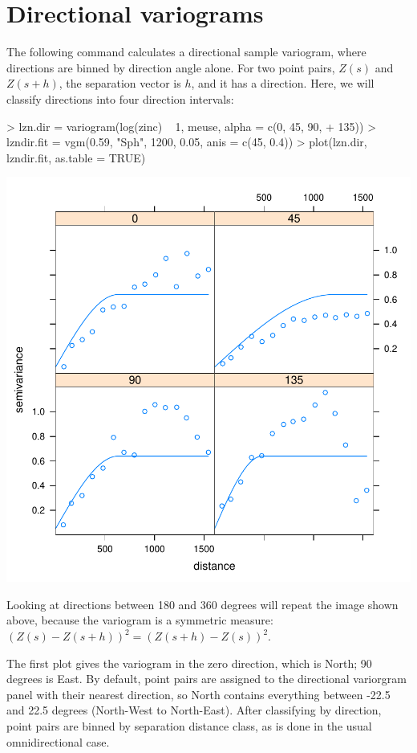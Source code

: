\documentclass[a4paper]{article}
\begin{document}
\section{Directional variograms}
The following command calculates a directional sample variogram, where
directions are binned by direction angle alone. For two point pairs,
$Z(s)$ and $Z(s+h)$, the separation vector is $h$, and it has a direction.
Here, we will classify directions into four direction intervals:

\begin{Schunk}
\begin{Sinput}
> lzn.dir = variogram(log(zinc) ~ 1, meuse, alpha = c(0, 45, 90, 
+     135))
> lzndir.fit = vgm(0.59, "Sph", 1200, 0.05, anis = c(45, 0.4))
> plot(lzn.dir, lzndir.fit, as.table = TRUE)
\end{Sinput}
\end{Schunk}

\includegraphics{gstat-017}

Looking at directions between 180 and 360 degrees will repeat the
image shown above, because the variogram is a symmetric measure:
$(Z(s)-Z(s+h))^2=(Z(s+h)-Z(s))^2$.

The first plot gives the variogram in the zero direction, which is
North; 90 degrees is East. By default, point pairs are assigned to the
directional variorgram panel with their nearest direction, so North
contains everything between -22.5 and 22.5 degrees (North-West to
North-East). After classifying by direction, point pairs are binned by
separation distance class, as is done in the usual omnidirectional case.
\end{document}

